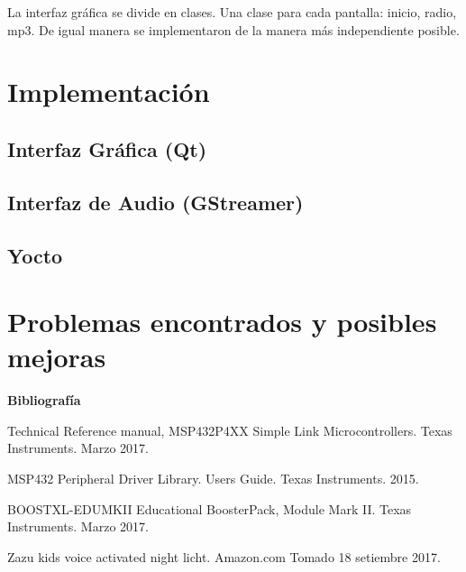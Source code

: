 La interfaz gráfica se divide en clases. Una clase para cada pantalla: inicio, radio, mp3. De igual
manera se implementaron de la manera más independiente posible. 

\section{Implementación}
\label{sec:implementation}

\subsection{Interfaz Gráfica (Qt)}
\label{sec:qt}

\subsection{Interfaz de Audio (GStreamer)}
\label{sec:gstramer}



\subsection{Yocto}
\label{sec:yocto}


\section{Problemas encontrados y posibles mejoras}
\label{sec:possible_fixes}



%


\textbf{ Bibliografía}

Technical Reference manual, MSP432P4XX Simple Link Microcontrollers. Texas Instruments. Marzo 2017.

MSP432 Peripheral Driver Library. Users Guide. Texas Instruments. 2015.

BOOSTXL-EDUMKII Educational BoosterPack, Module Mark II. Texas Instruments. Marzo 2017.

Zazu kids voice activated night licht. Amazon.com Tomado 18 setiembre 2017.

%
%
